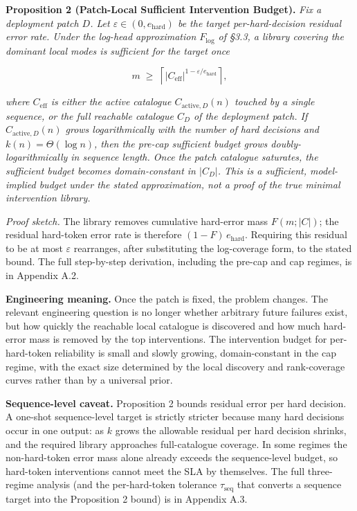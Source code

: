 \documentclass[
]{article}
\begin{document}
\textbf{Proposition 2 (Patch-Local Sufficient Intervention Budget).}
\emph{Fix a deployment patch \(D\). Let
\(\varepsilon \in (0, e_{\text{hard}})\) be the target per-hard-decision
residual error rate. Under the log-head approximation \(F_{\log}\) of
§3.3, a library covering the dominant local modes is sufficient for the
target once}

\[
m \;\geq\; \left\lceil |C_{\text{eff}}|^{1 - \varepsilon / e_{\text{hard}}} \right\rceil,
\]

\emph{where \(C_{\text{eff}}\) is either the active catalogue
\(C_{\text{active},D}(n)\) touched by a single sequence, or the full
reachable catalogue \(C_D\) of the deployment patch. If
\(C_{\text{active},D}(n)\) grows logarithmically with the number of hard
decisions and \(k(n) = \Theta(\log n)\), then the pre-cap sufficient
budget grows doubly-logarithmically in sequence length. Once the patch
catalogue saturates, the sufficient budget becomes domain-constant in
\(|C_D|\). This is a sufficient, model-implied budget under the stated
approximation, not a proof of the true minimal intervention library.}

\emph{Proof sketch.} The library removes cumulative hard-error mass
\(F(m; |C|)\); the residual hard-token error rate is therefore
\((1 - F)\,e_{\text{hard}}\). Requiring this residual to be at most
\(\varepsilon\) rearranges, after substituting the log-coverage form, to
the stated bound. The full step-by-step derivation, including the
pre-cap and cap regimes, is in Appendix A.2.

\textbf{Engineering meaning.} Once the patch is fixed, the problem
changes. The relevant engineering question is no longer whether
arbitrary future failures exist, but how quickly the reachable local
catalogue is discovered and how much hard-error mass is removed by the
top interventions. The intervention budget for per-hard-token
reliability is small and slowly growing, domain-constant in the cap
regime, with the exact size determined by the local discovery and
rank-coverage curves rather than by a universal prior.

\textbf{Sequence-level caveat.} Proposition 2 bounds residual error per
hard decision. A one-shot sequence-level target is strictly stricter
because many hard decisions occur in one output: as \(k\) grows the
allowable residual per hard decision shrinks, and the required library
approaches full-catalogue coverage. In some regimes the non-hard-token
error mass alone already exceeds the sequence-level budget, so
hard-token interventions cannot meet the SLA by themselves. The full
three-regime analysis (and the per-hard-token tolerance
\(\tau_{\text{seq}}\) that converts a sequence target into the
Proposition 2 bound) is in Appendix A.3.
\end{document}
